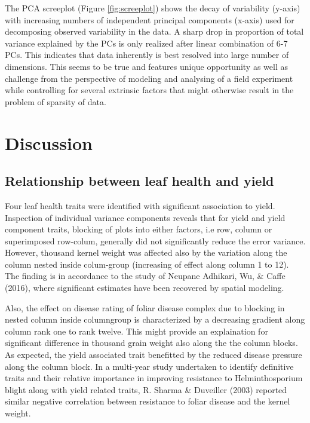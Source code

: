 \documentclass[12pt,oneside]{dukestatscithesis} %
\theoremstyle{definition}
\theoremstyle{definition}
\theoremstyle{definition}
\theoremstyle{remark}
\begin{document}
The PCA screeplot (Figure \ref{fig:screeplot}) shows the decay of
variability (y-axis) with increasing numbers of independent principal
components (x-axis) used for decomposing observed variability in the
data. A sharp drop in proportion of total variance explained by the PCs
is only realized after linear combination of 6-7 PCs. This indicates
that data inherently is best resolved into large number of dimensions.
This seems to be true and features unique opportunity as well as
challenge from the perspective of modeling and analysing of a field
experiment while controlling for several extrinsic factors that might
otherwise result in the problem of sparsity of data.

\chapter{Discussion}\label{discussion}

\section{Relationship between leaf health and
yield}\label{relationship-between-leaf-health-and-yield}

Four leaf health traits were identified with significant association to
yield. Inspection of individual variance components reveals that for
yield and yield component traits, blocking of plots into either factors,
i.e row, column or superimposed row-colum, generally did not
significantly reduce the error variance. However, thousand kernel weight
was affected also by the variation along the column nested inside
colum-group (increasing of effect along column 1 to 12). The finding is
in accordance to the study of Neupane Adhikari, Wu, \& Caffe (2016),
where significant estimates have been recovered by spatial modeling.

Also, the effect on disease rating of foliar disease complex due to
blocking in nested column inside columngroup is characterized by a
decreasing gradient along column rank one to rank twelve. This might
provide an explaination for significant difference in thousand grain
weight also along the the column blocks. As expected, the yield
associated trait benefitted by the reduced disease pressure along the
column block. In a multi-year study undertaken to identify definitive
traits and their relative importance in improving resistance to
Helminthosporium blight along with yield related traits, R. Sharma \&
Duveiller (2003) reported similar negative correlation between
resistance to foliar disease and the kernel weight.
\end{document}
